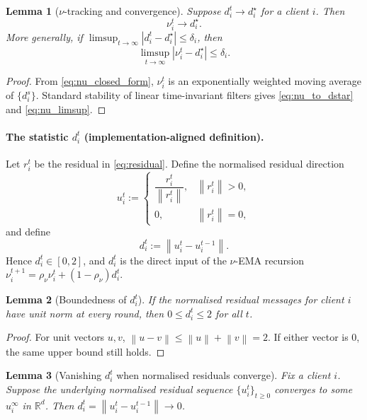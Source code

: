 \documentclass[11pt,a4paper]{article}
\newtheorem{lemma}{Lemma}
\theoremstyle{remark}
\newcommand{\R}{\mathbb{R}}
\newcommand{\norm}[1]{\left\lVert #1 \right\rVert}
\newcommand{\abs}[1]{\left\lvert #1 \right\rvert}
\begin{document}
\begin{lemma}[\(\nu\)-tracking and convergence]
\label{lem:nu_tracking}
Suppose \(d_i^t \to d_i^\star\) for a client \(i\). Then
\begin{equation}
    \nu_i^t \to d_i^\star.
    \label{eq:nu_to_dstar}
\end{equation}
More generally, if \(\limsup_{t\to\infty}\abs{d_i^t-d_i^\star}\le \delta_i\),
then
\begin{equation}
    \limsup_{t\to\infty}\abs{\nu_i^t-d_i^\star}\le \delta_i.
    \label{eq:nu_limsup}
\end{equation}
\end{lemma}

\begin{proof}
From \eqref{eq:nu_closed_form}, \(\nu_i^t\) is an exponentially weighted moving
average of \(\{d_i^s\}\). Standard stability of linear time-invariant filters
gives \eqref{eq:nu_to_dstar} and \eqref{eq:nu_limsup}.
\end{proof}

\paragraph{The statistic \(d_i^t\) (implementation-aligned definition).}
Let \(r_i^t\) be the residual in \eqref{eq:residual}. Define the normalised
residual direction
\[
    u_i^t
    :=
    \begin{cases}
        \dfrac{r_i^t}{\norm{r_i^t}}, & \norm{r_i^t}>0,\\[2mm]
        0, & \norm{r_i^t}=0,
    \end{cases}
\]
and define
\[
    d_i^t := \norm{u_i^t-u_i^{t-1}}.
\]
Hence \(d_i^t\in[0,2]\), and \(d_i^t\) is the direct input of the
\(\nu\)-EMA recursion \(\nu_i^{t+1}=\rho_\nu\nu_i^t+(1-\rho_\nu)d_i^t\).

\begin{lemma}[Boundedness of \(d_i^t\)]
\label{lem:d_bounded}
If the normalised residual messages for client \(i\) have unit norm at every
round, then \(0\le d_i^t\le 2\) for all \(t\).
\end{lemma}

\begin{proof}
For unit vectors \(u,v\), \(\norm{u-v}\le \norm{u}+\norm{v}=2\).
If either vector is \(0\), the same upper bound still holds.
\end{proof}

\begin{lemma}[Vanishing \(d_i^t\) when normalised residuals converge]
\label{lem:d_vanish_residual}
Fix a client \(i\). Suppose the underlying normalised residual sequence
\(\{u_i^t\}_{t\ge 0}\) converges to some \(u_i^\infty\) in \(\R^d\). Then
\(d_i^t=\norm{u_i^t-u_i^{t-1}}\to 0\).
\end{lemma}
\end{document}
